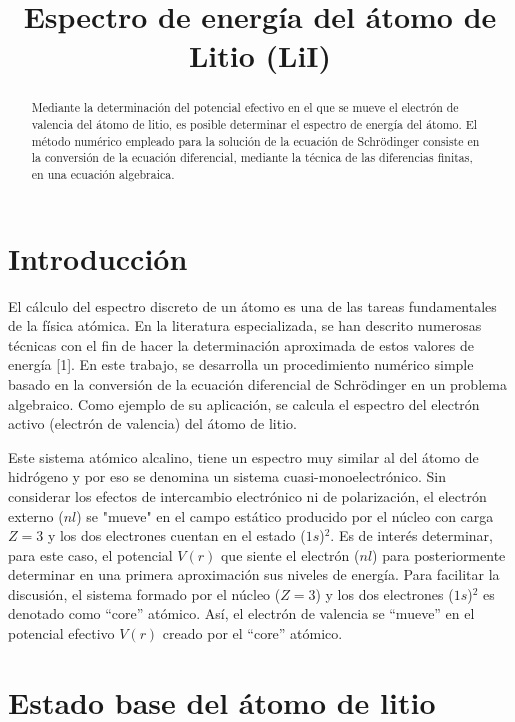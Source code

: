 \documentclass{article}
\title{Espectro de energía del átomo de Litio (LiI)}
\author{}
\date{}
\begin{document}
\maketitle

\begin{abstract}
Mediante la determinación del potencial efectivo en el que se mueve el electrón de valencia del átomo de litio, es posible determinar el espectro de energía del átomo. El método numérico empleado para la solución de la ecuación de Schrödinger consiste en la conversión de la ecuación diferencial, mediante la técnica de las diferencias finitas, en una ecuación algebraica.
\end{abstract}

\section{Introducción}

El cálculo del espectro discreto de un átomo es una de las tareas fundamentales de la física atómica. En la literatura especializada, se han descrito numerosas técnicas con el fin de hacer la determinación aproximada de estos valores de energía [1]. En este trabajo, se desarrolla un procedimiento numérico simple basado en la conversión de la ecuación diferencial de Schrödinger en un problema algebraico. Como ejemplo de su aplicación, se calcula el espectro del electrón activo (electrón de valencia) del átomo de litio.

Este sistema atómico alcalino, tiene un espectro muy similar al del átomo de hidrógeno y por eso se denomina un sistema cuasi-monoelectrónico. Sin considerar los efectos de intercambio electrónico ni de polarización, el electrón externo (\(nl\)) se "mueve" en el campo estático producido por el núcleo con carga \( Z = 3 \) y los dos electrones cuentan en el estado (\(1s\))\(^2\). Es de interés determinar, para este caso, el potencial \( V(r) \) que siente el electrón (\(nl\)) para posteriormente determinar en una primera aproximación sus niveles de energía. Para facilitar la discusión, el sistema formado por el núcleo (\( Z = 3 \)) y los dos electrones (\(1s\))\(^2\) es denotado como “core” atómico. Así, el electrón de valencia se “mueve” en el potencial efectivo \( V(r) \) creado por el “core” atómico.

\section{Estado base del átomo de litio}
\end{document}
